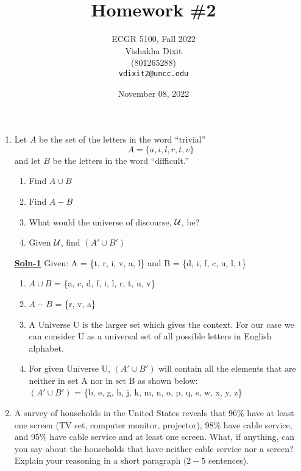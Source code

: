 \documentclass{article}
\begin{document}
\title{Homework \#2}
\author{ECGR 5100, Fall 2022 \\
        Vishakha Dixit \\
        (801265288) \\
\texttt{vdixit2@uncc.edu}}
\date{November 08, 2022}
\maketitle

\begin{enumerate}
\item   Let $A$ be the set of the letters in the word ``trivial''
        \[ A = \{a,i,l,r,t,v\} \]
        and let $B$ be the letters in the word ``difficult.''
        \begin{enumerate}
        \item   Find $A \cup B$
        \item   Find $A-B$
        \item   What would the universe of discourse, $\cal U$, be?
        \item   Given $\cal U$, find $(A' \cup B')$
        \end{enumerate}

        \textbf{\underline {Soln-1}} Given: A = \{t, r, i, v, a, l\} and B = \{d, i, f, c, u, l, t\}
        \begin{enumerate}
            \item $A \cup B$ = \{a, c, d, f, i, l, r, t, u, v\}
            \item $A-B$ = \{r, v, a\}
            \item A Universe U is the larger set which gives the context. For our case we can consider U as a universal set of all possible letters in English alphabet.
            \item For given Universe U, $(A' \cup B')$ will contain all the elements that are neither in set A nor in set B as shown below: \\
            $(A' \cup B')$ = \{b, e, g, h, j, k, m, n, o, p, q, s, w, x, y, z\}           
        \end{enumerate}

\item   A survey of households in the United States reveals that
        96\% have at least one screen (TV set, computer monitor,
        projector), 98\% have cable service, and 95\% have cable
        service and at least one screen.  What, if anything, can
        you say about the households that have neither cable service
        nor a screen?  Explain your reasoning in a short paragraph
        ($2-5$ sentences).


\end{enumerate}
\end{document}
